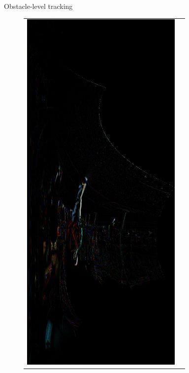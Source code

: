 \begin{frame}{Obstacle-level tracking}
\begin{overlayarea}{\textwidth}{\textheight}
{\begin{figure}
\begin{tabular}{ cc }
	\includegraphics[height=0.6\textheight]{polarDiff}\label{fig:cp04_polarDiff}
      \end{tabular}
    \end{figure}
    }
    \end{overlayarea}
  \note {
  
  }
\end{frame}

